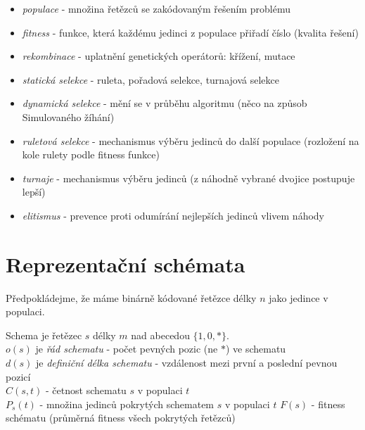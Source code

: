 \documentclass[a4paper]{article}      %
\newenvironment{definition}[1][Definice]{\begin{trivlist}
\item[\hskip \labelsep {\bfseries #1}]}{\end{trivlist}}
\begin{document}
\begin{itemize}
\item \emph{populace} - množina řetězců se zakódovaným řešením problému
\item \emph{fitness} - funkce, která každému jedinci z populace přiřadí číslo (kvalita řešení)
\item \emph{rekombinace} - uplatnění genetických operátorů: křížení, mutace
\item \emph{statická selekce} - ruleta, pořadová selekce, turnajová selekce
\item \emph{dynamická selekce} - mění se v průběhu algoritmu (něco na způsob Simulovaného žíhání)
\item \emph{ruletová selekce} - mechanismus výběru jedinců do další populace (rozložení na kole rulety podle fitness funkce)
\item \emph{turnaje} - mechanismus výběru jedinců (z náhodně vybrané dvojice postupuje lepší)
\item \emph{elitismus} - prevence proti odumírání nejlepších jedinců vlivem náhody
\end{itemize}


\section{Reprezentační schémata}
Předpokládejme, že máme binárně kódované řetězce délky $n$ jako jedince v populaci.

\begin{definition}[Schemata]
Schema je řetězec $s$ délky $m$ nad abecedou $\lbrace 1,0,* \rbrace$.\\
$o(s)$ je \emph{řád schematu} - počet pevných pozic (ne $*$) ve schematu\\
$d(s)$ je \emph{definiční délka schematu} - vzdálenost mezi první a poslední pevnou pozicí\\
$C(s,t)$ - četnost schematu $s$ v populaci $t$\\
$P_{s}(t)$ - množina jedinců pokrytých schematem $s$ v populaci $t$
$F(s)$ - fitness schématu (průměrná fitness všech pokrytých řetězců)
\end{definition}
\end{document}
